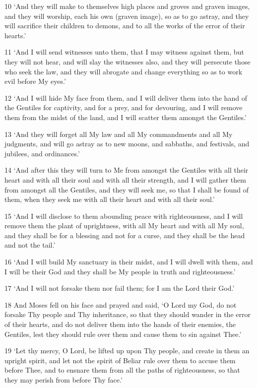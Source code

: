 \par 10 ‘And they will make to themselves high places and groves and graven images, and they will worship, each his own (graven image), so as to go astray, and they will sacrifice their children to demons, and to all the works of the error of their hearts.’
\par 11 ‘And I will send witnesses unto them, that I may witness against them, but they will not hear, and will slay the witnesses also, and they will persecute those who seek the law, and they will abrogate and change everything so as to work evil before My eyes.’
\par 12 ‘And I will hide My face from them, and I will deliver them into the hand of the Gentiles for captivity, and for a prey, and for devouring, and I will remove them from the midst of the land, and I will scatter them amongst the Gentiles.’
\par 13 ‘And they will forget all My law and all My commandments and all My judgments, and will go astray as to new moons, and sabbaths, and festivals, and jubilees, and ordinances.’
\par 14 ‘And after this they will turn to Me from amongst the Gentiles with all their heart and with all their soul and with all their strength, and I will gather them from amongst all the Gentiles, and they will seek me, so that I shall be found of them, when they seek me with all their heart and with all their soul.’
\par 15 ‘And I will disclose to them abounding peace with righteousness, and I will remove them the plant of uprightness, with all My heart and with all My soul, and they shall be for a blessing and not for a curse, and they shall be the head and not the tail.’
\par 16 ‘And I will build My sanctuary in their midst, and I will dwell with them, and I will be their God and they shall be My people in truth and righteousness.’
\par 17 ‘And I will not forsake them nor fail them; for I am the Lord their God.’
\par 18 And Moses fell on his face and prayed and said, ‘O Lord my God, do not forsake Thy people and Thy inheritance, so that they should wander in the error of their hearts, and do not deliver them into the hands of their enemies, the Gentiles, lest they should rule over them and cause them to sin against Thee.’
\par 19 ‘Let thy mercy, O Lord, be lifted up upon Thy people, and create in them an upright spirit, and let not the spirit of Beliar rule over them to accuse them before Thee, and to ensnare them from all the paths of righteousness, so that they may perish from before Thy face.’
